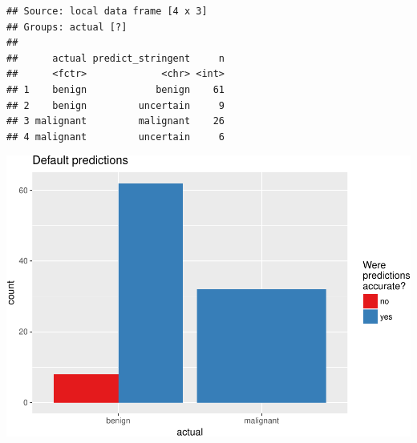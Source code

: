 \documentclass[]{article}
\newenvironment{Shaded}{\begin{snugshade}}{\end{snugshade}}
\newcommand{\KeywordTok}[1]{\textcolor[rgb]{0.13,0.29,0.53}{\textbf{{#1}}}}
\newcommand{\DataTypeTok}[1]{\textcolor[rgb]{0.13,0.29,0.53}{{#1}}}
\newcommand{\CharTok}[1]{\textcolor[rgb]{0.31,0.60,0.02}{{#1}}}
\newcommand{\StringTok}[1]{\textcolor[rgb]{0.31,0.60,0.02}{{#1}}}
\newcommand{\NormalTok}[1]{{#1}}
\begin{document}
\begin{verbatim}
## Source: local data frame [4 x 3]
## Groups: actual [?]
## 
##      actual predict_stringent     n
##      <fctr>             <chr> <int>
## 1    benign            benign    61
## 2    benign         uncertain     9
## 3 malignant         malignant    26
## 4 malignant         uncertain     6
\end{verbatim}

\begin{Shaded}
\end{Shaded}

\includegraphics{webinar_code_files/figure-latex/unnamed-chunk-62-1.pdf}
\end{document}
